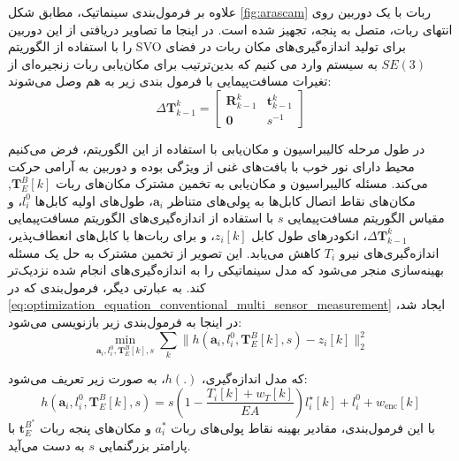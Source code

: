 علاوه بر فرمول‌بندی سینماتیک، مطابق شکل
\ref{fig:arascam}
 ربات با یک دوربین روی انتهای ربات، متصل به پنجه، تجهیز شده است. در اینجا ما تصاویر دریافتی از این دوربین را با استفاده از الگوریتم SVO
\cite{Forster2014ICRA}
  برای تولید اندازه‌گیری‌های مکان ربات در فضای
$SE(3)$
به سیستم وارد می کنیم که بدین‌ترتیب برای مکان‌یابی ربات زنجیره‌ای از تغیرات مسافت‌پیمایی با فرمول بندی زیر به هم وصل می‌شوند:
\begin{equation}
	\Delta \boldsymbol{T}^k_{k-1} = \begin{bmatrix} \boldsymbol{R}^k_{k-1} & \boldsymbol{t}^k_{k-1} \\ \boldsymbol{0} & s^{-1} \end{bmatrix}
\end{equation}

در طول مرحله کالیبراسیون و مکان‌یابی با استفاده از این الگوریتم، فرض می‌کنیم محیط‌ دارای نور خوب با بافت‌های غنی از ویژگی بوده و دوربین به آرامی حرکت می‌کند.  مسئله کالیبراسیون و مکان‌یابی به تخمین مشترک مکان‌های ربات
$\boldsymbol{T}^B_E [k]$,
مکان‌های نقاط اتصال کابل‌ها به پولی‌های متناظر
$\boldsymbol{a}_i$،
 طول‌های اولیه کابل‌ها
$l_{i}^0$،
و مقیاس الگوریتم مسافت‌پیمایی
$s$
با استفاده از اندازه‌گیری‌های الگوریتم مسافت‌پیمایی
 \( \Delta \boldsymbol{T}^k_{k-1} \)،
انکودرهای طول کابل
$z_i [k]$،
و برای ربات‌ها با کابل‌های انعطاف‌پذیر، اندازه‌گیری‌های نیرو 
$T_i$ 
کاهش می‌یابد. این تصویر از تخمین مشترک به حل یک مسئله بهینه‌سازی منجر می‌شود که مدل سینماتیکی را به اندازه‌گیری‌های انجام شده نزدیک‌تر کند. به عبارتی دیگر، فرمول‌بندی که در
 \ref{eq:optimization_equation_conventional_multi_sensor_measurement} 
 ایجاد شد، در اینجا به فرمول‌بندی زیر بازنویسی می‌شود:
\begin{equation}
	\min_{\boldsymbol{a}_i, l_{i}^0, \boldsymbol{T}^B_E [k], s} \sum_k \| h(\boldsymbol{a}_i, l_{i}^0, \boldsymbol{T}^B_E [k], s) - z_i [k] \|^2_2
\end{equation}

که مدل اندازه‌گیری، \( h(.) \)، به صورت زیر تعریف می‌شود:
\begin{equation} \label{eq:mathmatic_model_rigid_cable}
	h(\boldsymbol{a}_i, l_{i}^0, \boldsymbol{T}^B_E [k], s) = s \left( 1 - \frac{T_i [k] + w_T [k]}{EA} \right) l^\star_i [k] + l_{i}^0 + w_{\text{enc}} [k] 
\end{equation}
با این فرمول‌بندی، مقادیر بهینه نقاط پولی‌های ربات
$a_i^*$
و مکان‌های پنجه ربات
$\boldsymbol{t}^{B^{*}}_{E}$
با پارامتر بزرگنمایی
$s$
به دست می‌آید.



